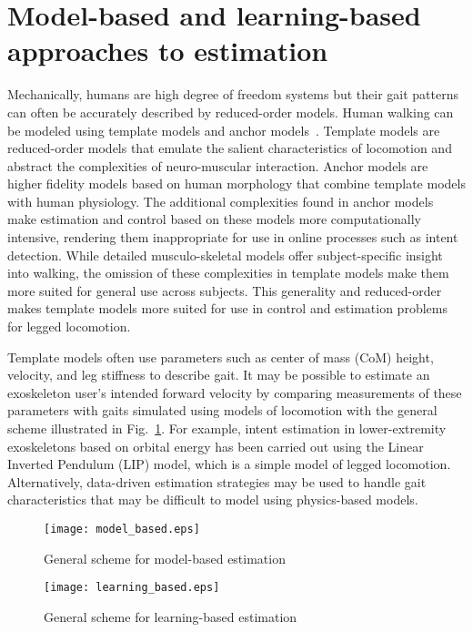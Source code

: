 \section{Model-based and learning-based approaches to estimation}

Mechanically, humans are high degree of freedom systems but their gait patterns can often be accurately described by reduced-order models. Human walking can be modeled using template models and anchor models~\cite{full1999templates}. Template models are reduced-order models that emulate the salient characteristics of locomotion and abstract the complexities of neuro-muscular interaction. Anchor models are higher fidelity models based on human morphology that combine template models with human physiology. The additional complexities found in anchor models make estimation and control based on these models more computationally intensive, rendering them inappropriate for use in online processes such as intent detection. While detailed musculo-skeletal models offer subject-specific insight into walking, the omission of these complexities in template models make them more suited for general use across subjects. This generality and reduced-order makes template models more suited for use in control and estimation problems for legged locomotion.

Template models often use parameters such as center of mass (CoM) height, velocity, and leg stiffness to describe gait. It may be possible to estimate an exoskeleton user's intended forward velocity by comparing measurements of these parameters with gaits simulated using models of locomotion with the general scheme illustrated in Fig.~\ref{fig:model-based}. For example, intent estimation in lower-extremity exoskeletons based on orbital energy \cite{chen2018dynamic} has been carried out using the Linear Inverted Pendulum (LIP) model, which is a simple model of legged locomotion.  Alternatively, data-driven estimation strategies \cite{ge2011neural, kalinowska2019data, joukov2017rhythmic} may be used to handle gait characteristics that may be difficult to model using physics-based models.

\begin{figure}
	\centering
	\texttt{[image: model\_based.eps]}
	\caption{General scheme for model-based estimation}\label{fig:model-based}
\end{figure}

\begin{figure}
	\centering
	\texttt{[image: learning\_based.eps]}
	\caption{General scheme for learning-based estimation}\label{fig:learning-based}
\end{figure}

